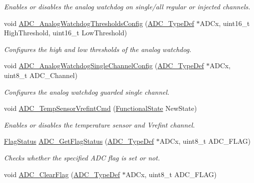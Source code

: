 \begin{DoxyCompactItemize}
\begin{DoxyCompactList}\small\item\em Enables or disables the analog watchdog on single/all regular or injected channels. \end{DoxyCompactList}\item 
void \hyperlink{group___a_d_c___exported___functions_ga79588d02aa8e4147f21cb90a4708366d}{A\+D\+C\+\_\+\+Analog\+Watchdog\+Thresholds\+Config} (\hyperlink{struct_a_d_c___type_def}{A\+D\+C\+\_\+\+Type\+Def} $\ast$A\+D\+Cx, uint16\+\_\+t High\+Threshold, uint16\+\_\+t Low\+Threshold)
\begin{DoxyCompactList}\small\item\em Configures the high and low thresholds of the analog watchdog. \end{DoxyCompactList}\item 
void \hyperlink{group___a_d_c___exported___functions_ga03cef3d12292ffa2b8520524d5b0226c}{A\+D\+C\+\_\+\+Analog\+Watchdog\+Single\+Channel\+Config} (\hyperlink{struct_a_d_c___type_def}{A\+D\+C\+\_\+\+Type\+Def} $\ast$A\+D\+Cx, uint8\+\_\+t A\+D\+C\+\_\+\+Channel)
\begin{DoxyCompactList}\small\item\em Configures the analog watchdog guarded single channel. \end{DoxyCompactList}\item 
void \hyperlink{group___a_d_c___exported___functions_ga848682e2d7d3de9f8cf03ffa4c11f0b5}{A\+D\+C\+\_\+\+Temp\+Sensor\+Vrefint\+Cmd} (\hyperlink{group___exported__types_gac9a7e9a35d2513ec15c3b537aaa4fba1}{Functional\+State} New\+State)
\begin{DoxyCompactList}\small\item\em Enables or disables the temperature sensor and Vrefint channel. \end{DoxyCompactList}\item 
\hyperlink{group___exported__types_ga89136caac2e14c55151f527ac02daaff}{Flag\+Status} \hyperlink{group___a_d_c___exported___functions_gaa12546e51ec905c90a3aada432bd4633}{A\+D\+C\+\_\+\+Get\+Flag\+Status} (\hyperlink{struct_a_d_c___type_def}{A\+D\+C\+\_\+\+Type\+Def} $\ast$A\+D\+Cx, uint8\+\_\+t A\+D\+C\+\_\+\+F\+L\+AG)
\begin{DoxyCompactList}\small\item\em Checks whether the specified A\+DC flag is set or not. \end{DoxyCompactList}\item 
void \hyperlink{group___a_d_c___exported___functions_gaf34f36798f811b4a41321ea2d12118d4}{A\+D\+C\+\_\+\+Clear\+Flag} (\hyperlink{struct_a_d_c___type_def}{A\+D\+C\+\_\+\+Type\+Def} $\ast$A\+D\+Cx, uint8\+\_\+t A\+D\+C\+\_\+\+F\+L\+AG)

\end{DoxyCompactItemize}
